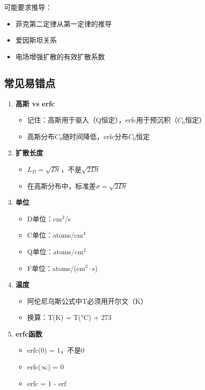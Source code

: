 \documentclass[UTF8,12pt,a4paper]{ctexart}
\begin{document}
可能要求推导：
\begin{itemize}
    \item 菲克第二定律从第一定律的推导
    \item 爱因斯坦关系
    \item 电场增强扩散的有效扩散系数
\end{itemize}

\subsection{常见易错点}

\begin{enumerate}
    \item \textbf{高斯 vs erfc}
    \begin{itemize}
        \item 记住：高斯用于驱入（Q恒定），erfc用于预沉积（$C_0$恒定）
        \item 高斯分布$C_0$随时间降低，erfc分布$C_0$恒定
    \end{itemize}
    
    \item \textbf{扩散长度}
    \begin{itemize}
        \item $L_D = \sqrt{Dt}$，不是$\sqrt{2Dt}$
        \item 在高斯分布中，标准差$\sigma = \sqrt{2Dt}$
    \end{itemize}
    
    \item \textbf{单位}
    \begin{itemize}
        \item D单位：cm$^2$/s
        \item C单位：atoms/cm$^3$
        \item Q单位：atoms/cm$^2$
        \item F单位：atoms/(cm$^2\cdot$s)
    \end{itemize}
    
    \item \textbf{温度}
    \begin{itemize}
        \item 阿伦尼乌斯公式中T必须用开尔文（K）
        \item 换算：T(K) = T(°C) + 273
    \end{itemize}
    
    \item \textbf{erfc函数}
    \begin{itemize}
        \item erfc(0) = 1，不是0
        \item erfc($\infty$) = 0
        \item erfc = 1 - erf
    \end{itemize}
\end{enumerate}
\end{document}
